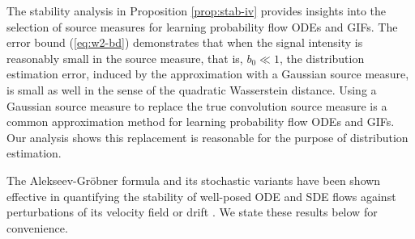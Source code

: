 \documentclass[twoside,11pt]{article}
\def\paref#1{(\ref{#1})}
\numberwithin{equation}{section}
\begin{document}
    The stability analysis in Proposition \ref{prop:stab-iv} provides insights
    into the selection of source measures for learning probability flow ODEs and GIFs.
    The error bound \paref{eq:w2-bd} demonstrates that when the signal intensity is reasonably small in the source measure, that is, $b_0 \ll 1$, the distribution estimation error, induced by the approximation with a Gaussian source measure, is small as well in the sense of the quadratic Wasserstein distance.
    Using a Gaussian source measure to replace the true convolution source measure is a common approximation method for learning probability flow ODEs and
    GIFs. Our analysis shows this replacement is
    reasonable for the purpose of distribution estimation.


The Alekseev-Gr{\"o}bner formula and its stochastic variants \citep{moral2022backward} have been shown effective in quantifying the stability of well-posed ODE and SDE flows against perturbations of its velocity field or drift \citep{bortoli2022convergence, benton2023error}. We state these results below for convenience.
\end{document}
